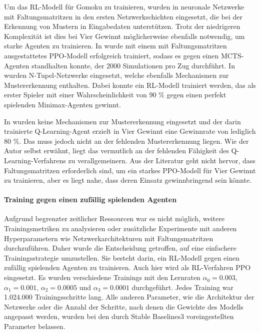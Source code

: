 Um das RL-Modell für Gomoku zu trainieren, wurden in \cite{Zhong.2020} neuronale Netzwerke mit Faltungsmatritzen in den ersten Netzwerkschichten eingesetzt, die bei der Erkennung von Mustern in Eingabedaten unterstützen. Trotz der niedrigeren Komplexität ist dies bei Vier Gewinnt möglicherweise ebenfalls notwendig, um starke Agenten zu trainieren. In \cite{Wäldchen.2022} wurde mit einem mit Faltungsmatritzen ausgestattetes PPO-Modell erfolgreich trainiert, sodass es gegen einen MCTS-Agenten standhalten konnte, der 2000 Simulationen pro Zug durchführt. In \cite{Thill.2012} wurden N-Tupel-Netzwerke eingesetzt, welche ebenfalls Mechanismen zur Mustererkennung enthalten. Dabei konnte ein RL-Modell trainiert werden, das als erster Spieler mit einer Wahrscheinlichkeit von 90 \% gegen einen perfekt spielenden Minimax-Agenten gewinnt.

In \cite{Taylor.2024} wurden keine Mechanismen zur Mustererkennung eingesetzt und der darin trainierte Q-Learning-Agent erzielt in Vier Gewinnt eine Gewinnrate von lediglich 80 \%. Das muss jedoch nicht an der fehlenden Mustererkennung liegen. Wie der Autor selbst erwähnt, liegt das vermutlich an der fehlenden Fähigkeit des Q-Learning-Verfahrens zu verallgemeinern. Aus der Literatur geht nicht hervor, dass Faltungsmatritzen erforderlich sind, um ein starkes PPO-Modell für Vier Gewinnt zu trainieren, aber es liegt nahe, dass deren Einsatz gewinnbringend sein könnte.

\paragraph{Training gegen einen zufällig spielenden Agenten}

\label{training-random}

Aufgrund begrenzter zeitlicher Ressourcen war es nicht möglich, weitere Trainingsmetriken zu analysieren oder zusätzliche Experimente mit anderen Hyperparametern wie Netzwerkarchitekturen mit Faltungsmatritzen durchzuführen. Daher wurde die Entscheidung getroffen, auf eine einfachere Trainingsstrategie umzustellen. Sie besteht darin, ein RL-Modell gegen einen zufällig spielenden Agenten zu trainieren. Auch hier wird als RL-Verfahren PPO eingesetzt. Es wurden verschiedene Trainings mit den Lernraten $\alpha_0 = 0.003$, $\alpha_1 = 0.001$, $\alpha_2 = 0.0005$ und $\alpha_3 = 0.0001$ durchgeführt. Jedes Training war 1.024.000 Trainingsschritte lang. Alle anderen Parameter, wie die Architektur der Netzwerke oder die Anzahl der Schritte, nach denen die Gewichte des Modells angepasst werden, wurden bei den durch Stable Baselines3 voreingestellten Parameter belassen.

